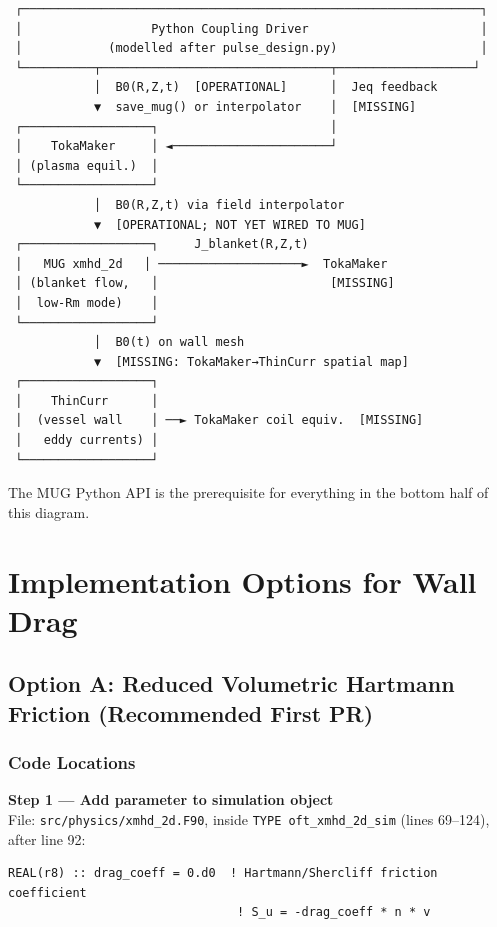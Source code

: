 \documentclass[11pt,letterpaper]{article}
\begin{document}
\begin{verbatim}
 ┌────────────────────────────────────────────────────────────────┐
 │                  Python Coupling Driver                        │
 │            (modelled after pulse_design.py)                    │
 └──────────┬────────────────────────────────┬───────────────────┘
            │  B0(R,Z,t)  [OPERATIONAL]      │  Jeq feedback
            ▼  save_mug() or interpolator    │  [MISSING]
 ┌──────────────────┐                        │
 │    TokaMaker     │ ◄──────────────────────┘
 │ (plasma equil.)  │
 └──────────────────┘
            │  B0(R,Z,t) via field interpolator
            ▼  [OPERATIONAL; NOT YET WIRED TO MUG]
 ┌──────────────────┐     J_blanket(R,Z,t)
 │   MUG xmhd_2d   │ ────────────────────►  TokaMaker
 │ (blanket flow,   │                        [MISSING]
 │  low-Rm mode)    │
 └──────────────────┘
            │  B0(t) on wall mesh
            ▼  [MISSING: TokaMaker→ThinCurr spatial map]
 ┌──────────────────┐
 │    ThinCurr      │
 │  (vessel wall    │ ──► TokaMaker coil equiv.  [MISSING]
 │   eddy currents) │
 └──────────────────┘
\end{verbatim}

The MUG Python API is the prerequisite for everything in the bottom half of
this diagram.

\section{Implementation Options for Wall Drag}
\label{sec:impl_options}

\subsection{Option A: Reduced Volumetric Hartmann Friction (\textbf{Recommended First PR})}

\subsubsection{Code Locations}

\textbf{Step 1 --- Add parameter to simulation object} \\
File: \texttt{src/physics/xmhd\_2d.F90}, inside \texttt{TYPE oft\_xmhd\_2d\_sim}
(lines 69--124), after line 92:

\begin{lstlisting}[caption={New field in oft\_xmhd\_2d\_sim (after line 92)}]
REAL(r8) :: drag_coeff = 0.d0  ! Hartmann/Shercliff friction coefficient
                                ! S_u = -drag_coeff * n * v
\end{lstlisting}
\end{document}
